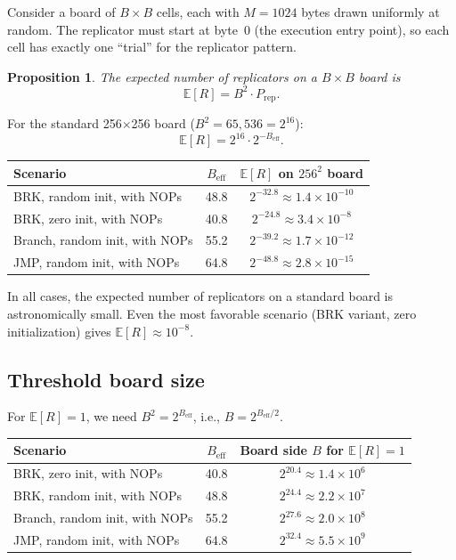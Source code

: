 \documentclass{article}
\newcommand{\Beff}{B_{\mathrm{eff}}}
\newcommand{\Prep}{P_{\mathrm{rep}}}
\newtheorem{proposition}{Proposition}
\begin{document}
Consider a board of $B \times B$ cells, each with $M = 1024$ bytes
drawn uniformly at random. The replicator must start at byte~0
(the execution entry point), so each cell has exactly one ``trial''
for the replicator pattern.

\begin{proposition}
The expected number of replicators on a $B \times B$ board is
\[
  \mathbb{E}[R] = B^2 \cdot \Prep.
\]
\end{proposition}

For the standard 256$\times$256 board ($B^2 = 65{,}536 = 2^{16}$):
\[
  \mathbb{E}[R] = 2^{16} \cdot 2^{-\Beff}.
\]

\begin{center}
\begin{tabular}{lcc}
\toprule
Scenario & $\Beff$ & $\mathbb{E}[R]$ on $256^2$ board \\
\midrule
BRK, random init, with NOPs & 48.8 & $2^{-32.8} \approx 1.4 \times 10^{-10}$ \\
BRK, zero init, with NOPs & 40.8 & $2^{-24.8} \approx 3.4 \times 10^{-8}$ \\
Branch, random init, with NOPs & 55.2 & $2^{-39.2} \approx 1.7 \times 10^{-12}$ \\
JMP, random init, with NOPs & 64.8 & $2^{-48.8} \approx 2.8 \times 10^{-15}$ \\
\bottomrule
\end{tabular}
\end{center}

In all cases, the expected number of replicators on a standard board is
astronomically small. Even the most favorable scenario (BRK variant,
zero initialization) gives $\mathbb{E}[R] \approx 10^{-8}$.

\subsection{Threshold board size}

For $\mathbb{E}[R] = 1$, we need $B^2 = 2^{\Beff}$, i.e.,
$B = 2^{\Beff/2}$.

\begin{center}
\begin{tabular}{lcc}
\toprule
Scenario & $\Beff$ & Board side $B$ for $\mathbb{E}[R]=1$ \\
\midrule
BRK, zero init, with NOPs & 40.8 & $2^{20.4} \approx 1.4 \times 10^6$ \\
BRK, random init, with NOPs & 48.8 & $2^{24.4} \approx 2.2 \times 10^7$ \\
Branch, random init, with NOPs & 55.2 & $2^{27.6} \approx 2.0 \times 10^8$ \\
JMP, random init, with NOPs & 64.8 & $2^{32.4} \approx 5.5 \times 10^9$ \\
\bottomrule
\end{tabular}
\end{center}
\end{document}
